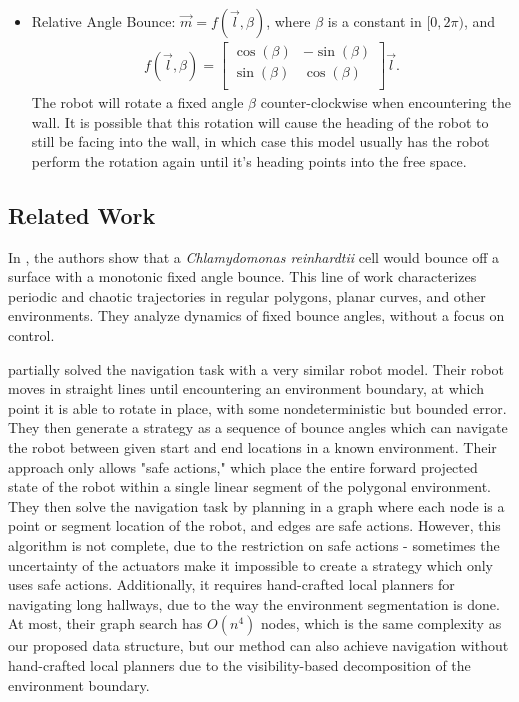 \documentclass[letterpaper, 10 pt, conference]{ieeeconf}  %
\begin{document}
\begin{itemize}
    \item Relative Angle Bounce: $\vec{m} = f(\vec{l}, \beta)$, where $\beta$ is a constant in $[0, 2\pi)$, and \begin{eqnarray*}f(\vec{l}, \beta) = \begin{bmatrix}
    \cos(\beta) & -\sin(\beta)\\
    \sin(\beta) & \cos(\beta)\\
    \end{bmatrix}\vec{l}.
    \end{eqnarray*} The robot will rotate a fixed angle $\beta$ counter-clockwise when encountering the wall. It is possible that this rotation will cause the heading of the robot to still be facing into the wall, in which case this model usually has the robot perform the rotation again until it's heading points into the free space.
\end{itemize}




\subsection{Related Work}

In \cite{microorg}, the authors show that a \textit{Chlamydomonas reinhardtii} cell would bounce off a surface with a monotonic fixed angle bounce. This line of work characterizes periodic and chaotic trajectories in regular polygons, planar curves, and other environments. They analyze dynamics of fixed bounce angles, without a focus on control.

\cite{lewis2013planning} partially solved the navigation task with a very similar robot
model. Their robot moves in straight lines until encountering an environment
boundary, at which point it is able to rotate in place, with some nondeterministic but
bounded error. They then generate a strategy as a sequence of bounce angles which can navigate the robot between given start and end locations in a known environment. Their approach only allows "safe actions," which place
the entire forward projected state of the robot within a single
linear segment of the polygonal environment. They then solve the navigation task by
planning in a graph where each node is a point or segment
location of the robot, and edges are safe actions. However, this algorithm is
not complete, due to the restriction on safe actions -
sometimes the uncertainty of the actuators make it impossible to create a
strategy which only uses safe actions. Additionally, it requires hand-crafted local planners for navigating long hallways, due to the way the environment segmentation is done. At most, their graph search has $O(n^4)$ nodes, which is the same complexity as our proposed data structure, but our method can also achieve navigation without hand-crafted local planners due to the visibility-based decomposition of the environment boundary.
\end{document}

